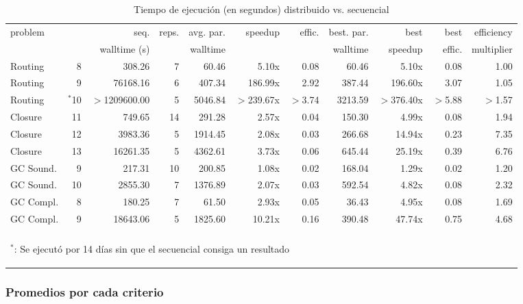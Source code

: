 \begin{table}
	\small
	\begin{tabular}{lrrrrrrrrrr}
		\toprule
		problem	&			&	seq. 				&	reps.	& avg. par.		&	speedup	&	effic.		& best. par.	& best 		& best			& efficiency \\
				&			&		walltime (s)	&	 		& walltime	&			&	 			& walltime		& speedup 	& effic.	& multiplier \\
		\cmidrule(r){1-11}
		Routing	&	8		&	308.26				&		7 	& 60.46			& 5.10x		&	0.08 		& 60.46			&	5.10x	& 0.08			& 1.00
\\
		Routing	&	9		&	76168.16			&	6 		& 407.34		& 	186.99x	&	2.92 		& 387.44		& 196.60x	& 3.07			& 1.05
\\
		Routing	&	$^*$10	&	$>$1209600.00		&	5 		& 5046.84		&$>$239.67x	&	$>$3.74 	& 3213.59		& $>$376.40x	& $>$5.88			& $>$1.57
\\
		\cmidrule(r){1-11}
		Closure	&	11		&	749.65				&	14 		& 291.28		&	2.57x	&	0.04 		& 150.30		&  4.99x	& 0.08			& 1.94
\\		Closure	&	12		&	3983.36				&	5 		& 1914.45		&	2.08x	&	0.03 		& 266.68		& 14.94x	& 0.23			& 7.35
\\		Closure	&	13		&	16261.35			& 5 		&	4362.61		&	3.73x	&	0.06 		& 645.44		& 25.19x	& 0.39			& 6.76
\\
		\cmidrule(r){1-11}
		GC Sound.&	9	&	217.31				&	10 		& 200.85		&	1.08x	&	0.02 		& 168.04		& 1.29x		& 0.02			& 1.20
\\
		GC Sound.&	10	&	 2855.30			&	7 		& 1376.89		&	2.07x	&	0.03 		& 592.54		& 4.82x		& 0.08			& 2.32
\\
		\cmidrule(r){1-11}
		GC Compl.	& 8	&	180.25				&	7 		& 61.50			&	2.93x	&	0.05 		& 36.43			& 4.95x		& 0.08			& 1.69
\\
		GC Compl.	& 9	&	18643.06			&	5 		& 1825.60		&	10.21x	&	0.16 		& 390.48		& 47.74x	& 0.75			& 4.68
\\
		\bottomrule
		\\
		\multicolumn{10}{l}{\begin{tiny}$^*$: Se ejecutó por 14 días sin que el \ssolver secuencial consiga un resultado\end{tiny}}
	\end{tabular}
	\caption{Tiempo de ejecución (en segundos) distribuido vs. secuencial}
	\label{tab:mejorlearning}
\end{table}

\subsubsection{Promedios por cada criterio}

